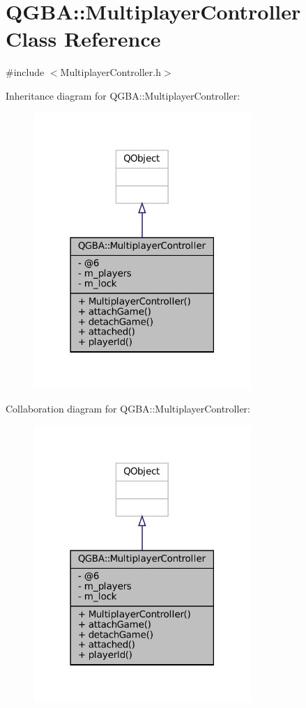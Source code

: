 \hypertarget{class_q_g_b_a_1_1_multiplayer_controller}{}\section{Q\+G\+BA\+:\+:Multiplayer\+Controller Class Reference}
\label{class_q_g_b_a_1_1_multiplayer_controller}


{\ttfamily \#include $<$Multiplayer\+Controller.\+h$>$}



Inheritance diagram for Q\+G\+BA\+:\+:Multiplayer\+Controller\+:
\nopagebreak
\begin{figure}[H]
\begin{center}
\leavevmode
\includegraphics[width=234pt]{class_q_g_b_a_1_1_multiplayer_controller__inherit__graph}
\end{center}
\end{figure}


Collaboration diagram for Q\+G\+BA\+:\+:Multiplayer\+Controller\+:
\nopagebreak
\begin{figure}[H]
\begin{center}
\leavevmode
\includegraphics[width=234pt]{class_q_g_b_a_1_1_multiplayer_controller__coll__graph}
\end{center}
\end{figure}
